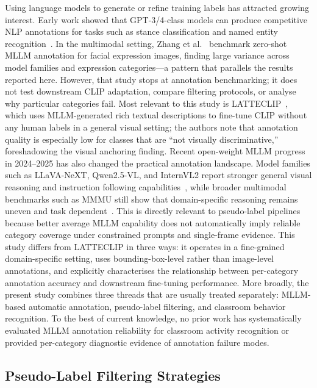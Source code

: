 \documentclass[10pt,letterpaper]{article}
\begin{document}
Using language models to generate or refine training labels has
attracted growing interest.
Early work showed that GPT-3/4-class models can produce competitive NLP
annotations for tasks such as stance classification and named entity
recognition~\cite{gilardi2023chatgpt,he2023annollm}.
In the multimodal setting, Zhang et al.~\cite{zhang2024zero} benchmark
zero-shot MLLM annotation for facial expression images, finding large
variance across model families and expression categories---a pattern
that parallels the results reported here.
However, that study stops at annotation benchmarking; it does not test
downstream CLIP adaptation, compare filtering protocols, or analyse why
particular categories fail.
Most relevant to this study is LATTECLIP~\cite{cao2025latteclip}, which
uses MLLM-generated rich textual descriptions to fine-tune CLIP without
any human labels in a general visual setting; the authors note that
annotation quality is especially low for classes that are ``not
visually discriminative,'' foreshadowing the visual anchoring
finding.
Recent open-weight MLLM progress in 2024--2025 has also changed the
practical annotation landscape.
Model families such as LLaVA-NeXT, Qwen2.5-VL, and InternVL2 report
stronger general visual reasoning and instruction following
capabilities~\cite{liu2024llavanext,qwen2025technical,chen2024internvl2},
while broader multimodal benchmarks such as MMMU still show that
domain-specific reasoning remains uneven and task dependent~\cite{yue2024mmmu}.
This is directly relevant to pseudo-label pipelines because better
average MLLM capability does not automatically imply reliable category
coverage under constrained prompts and single-frame evidence.
This study differs from LATTECLIP in three ways: it operates in a
fine-grained domain-specific setting, uses bounding-box-level rather
than image-level annotations, and explicitly characterises the
relationship between per-category annotation accuracy and downstream
fine-tuning performance.
More broadly, the present study combines three threads that are usually
treated separately: MLLM-based automatic annotation, pseudo-label
filtering, and classroom behavior recognition.
To the best of current knowledge, no prior work has systematically evaluated MLLM
annotation reliability for classroom activity recognition or provided
per-category diagnostic evidence of annotation failure modes.

\subsection*{Pseudo-Label Filtering Strategies}
\end{document}
